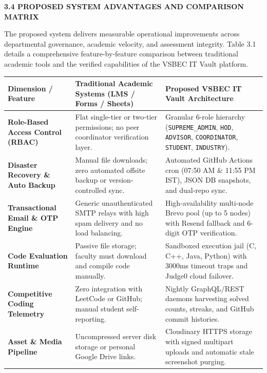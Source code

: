 {\vspace{0.4cm}
{\fontsize{14pt}{18pt}\selectfont\bfseries 3.4 PROPOSED SYSTEM ADVANTAGES AND COMPARISON MATRIX\par}
\vspace{0.3cm}

The proposed system delivers measurable operational improvements across departmental governance, academic velocity, and assessment integrity. Table 3.1 details a comprehensive feature-by-feature comparison between traditional academic tools and the verified capabilities of the VSBEC IT Vault platform.\par}

\vspace{0.3cm}
\begin{table}[H]
  \centering
  \fontsize{9.5pt}{13.5pt}\selectfont
  \begin{tabularx}{\textwidth}{|p{3.2cm}|p{5.8cm}|L|}
    \hline
    \textbf{Dimension / Feature} & \textbf{Traditional Academic Systems (LMS / Forms / Sheets)} & \textbf{Proposed VSBEC IT Vault Architecture} \\
    \hline
    \textbf{Role-Based Access Control (RBAC)} & Flat single-tier or two-tier permissions; no peer coordinator verification layer. & Granular 6-role hierarchy (\texttt{SUPREME\_ADMIN}, \texttt{HOD}, \texttt{ADVISOR}, \texttt{COORDINATOR}, \texttt{STUDENT}, \texttt{INDUSTRY}). \\
    \hline
    \textbf{Disaster Recovery \& Auto Backup} & Manual file downloads; zero automated offsite backup or version-controlled sync. & Automated GitHub Actions cron (07:50 AM \& 11:55 PM IST), JSON DB snapshots, and dual-repo sync. \\
    \hline
    \textbf{Transactional Email \& OTP Engine} & Generic unauthenticated SMTP relays with high spam delivery and no load balancing. & High-availability multi-node Brevo pool (up to 5 nodes) with Resend fallback and 6-digit OTP verification. \\
    \hline
    \textbf{Code Evaluation Runtime} & Passive file storage; faculty must download and compile code manually. & Sandboxed execution jail (C, C++, Java, Python) with 3000ms timeout traps and Judge0 cloud failover. \\
    \hline
    \textbf{Competitive Coding Telemetry} & Zero integration with LeetCode or GitHub; manual student self-reporting. & Nightly GraphQL/REST daemons harvesting solved counts, streaks, and GitHub commit histories. \\
    \hline
    \textbf{Asset \& Media Pipeline} & Uncompressed server disk storage or personal Google Drive links. & Cloudinary HTTPS storage with signed multipart uploads and automatic stale screenshot purging. \\

\end{tabularx}
\end{table}
